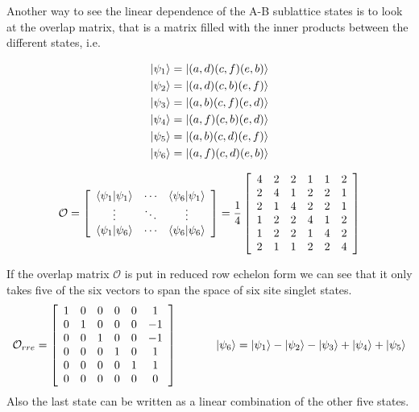 Another way to see the linear dependence of the A-B sublattice states is to look at the overlap matrix, that is a matrix filled with the inner products between the different states, i.e.

\begin{minipage}{0.0\textwidth} 
\centering
	\begin{align*}
		\lvert {\psi_1} \rangle &= \lvert {(a,d)(c,f)(e,b)} \rangle \\
		\lvert {\psi_2} \rangle &= \lvert {(a,d)(c,b)(e,f)} \rangle \\
		\lvert {\psi_3} \rangle &= \lvert {(a,b)(c,f)(e,d)} \rangle \\
		\lvert {\psi_4} \rangle &= \lvert {(a,f)(c,b)(e,d)} \rangle \\
		\lvert {\psi_5} \rangle &= \lvert {(a,b)(c,d)(e,f)} \rangle \\
		\lvert {\psi_6} \rangle &= \lvert {(a,f)(c,d)(e,b)} \rangle 
	\end{align*}
\end{minipage}
\hspace{0.5cm}
\begin{minipage}[b]{0.0\linewidth}
\centering 
	\begin{equation}
		\mathcal{O} = \left[\begin{array}{ccc}
		\langle{\psi_1}\vert{\psi_1}\rangle & \cdots & \langle{\psi_6}\vert{\psi_1}\rangle\\
		\vdots&\ddots&\vdots\\
		\langle{\psi_1}\vert{\psi_6}\rangle&\cdots&\langle{\psi_6}\vert{\psi_6}\rangle\\
		\end{array}\right] =
		\frac{1}{4}
		\left[\begin{array}{cccccc}
		4&2&2&1&1&2\\
		2&4&1&2&2&1\\
		2&1&4&2&2&1\\
		1&2&2&4&1&2\\
		1&2&2&1&4&2\\
		2&1&1&2&2&4
		\end{array}\right] \nonumber
	\end{equation}
\end{minipage}

\noindent If the overlap matrix $\mathcal{O}$ is put in reduced row echelon form we can see that it only takes five of the six vectors to span the space of six site singlet states.  
\begin{equation}
 \mathcal{O}_{rre} =
 \left[\begin{array}{cccccc}
		1&0&0&0&0&1\\
		0&1&0&0&0&-1\\
		0&0&1&0&0&-1\\
		0&0&0&1&0&1\\
		0&0&0&0&1&1\\
		0&0&0&0&0&0
		\end{array}\right] \hspace{1.2cm}
		\lvert {\psi_6} \rangle = \lvert {\psi_1} \rangle -\lvert {\psi_2} \rangle -\lvert {\psi_3} \rangle +\lvert {\psi_4} \rangle + \lvert {\psi_5} \rangle
\end{equation}
Also the last state can be written as a linear combination of the other five states.

